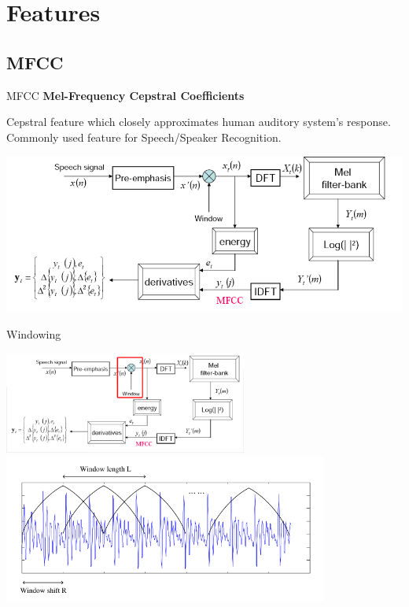 


\section{Features}
\subsection{MFCC}
\begin{frame}[label=mfcc]{MFCC}
  \textbf{Mel-Frequency Cepstral Coefficients}

  Cepstral feature which closely approximates human auditory system's response.
  Commonly used feature for Speech/Speaker Recognition.
\begin{center}
  \includegraphics[width=\textwidth]{res/MFCC.png}
\end{center}
\end{frame}

\begin{frame}{Windowing}
\begin{center}
  \includegraphics[width=0.6\textwidth]{res/MFCC-windowing.png}\\
  \includegraphics[width=0.8\textwidth]{res/MFCC-windowing-frames.png}
\end{center}
\end{frame}

